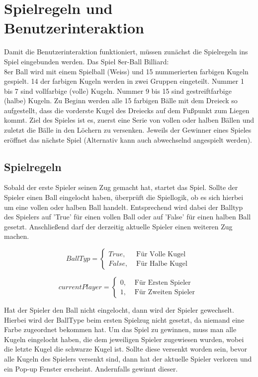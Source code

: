 \section{Spielregeln und Benutzerinteraktion}
Damit die Benutzerinteraktion funktioniert, müssen zunächst die Spielregeln ins Spiel eingebunden werden. Das Spiel 8er-Ball Billiard: \\
8er Ball wird mit einem Spielball (Weiss) und 15 nummerierten farbigen Kugeln gespielt. 14 der farbigen Kugeln werden in zwei Gruppen eingeteilt. Nummer 1 bis 7 sind vollfarbige (volle) Kugeln. Nummer 9 bis 15 sind gestreiftfarbige (halbe) Kugeln. Zu Beginn werden alle 15 farbigen Bälle mit dem Dreieck so aufgestellt, dass die vorderste Kugel des Dreiecks auf dem Fußpunkt zum Liegen kommt. Ziel des Spieles ist es, zuerst eine Serie von vollen oder halben Bällen und zuletzt die Bälle in den Löchern zu versenken. Jeweils der Gewinner eines Spieles eröffnet das nächste Spiel (Alternativ kann auch abwechselnd angespielt werden).

\subsection{Spielregeln}
Sobald der erste Spieler seinen Zug gemacht hat, startet das Spiel.
Sollte der Spieler einen Ball eingelocht haben, überprüft die Spiellogik, ob es sich hierbei um eine vollen oder halben Ball handelt. Entsprechend wird dabei der Balltyp des Spielers auf 'True' für einen vollen Ball oder auf 'False' für einen halben Ball gesetzt. Anschließend darf der derzeitig aktuelle Spieler einen weiteren Zug machen.

\begin{equation}
BallTyp = \begin{cases}
True, & \text{ Für Volle Kugel } \\
False, & \text{ Für Halbe Kugel }
\end{cases}
\end{equation}

\begin{equation}
currentPlayer = \begin{cases}
0, & \text{ Für Ersten Spieler } \\
1, & \text{ Für Zweiten Spieler }
\end{cases}
\end{equation}

Hat der Spieler den Ball nicht eingelocht, dann wird der Spieler gewechselt.
Hierbei wird der BallType beim ersten Spielzug nicht gesetzt, da niemand eine Farbe zugeordnet bekommen hat.
Um das Spiel zu gewinnen, muss man alle Kugeln eingelocht haben, die dem jeweiligen Spieler zugewiesen wurden, wobei die letzte Kugel die schwarze Kugel ist. Sollte diese versenkt worden sein, bevor alle Kugeln des Spielers versenkt sind, dann hat der aktuelle Spieler verloren und ein Pop-up Fenster erscheint. Andernfalls gewinnt dieser.

